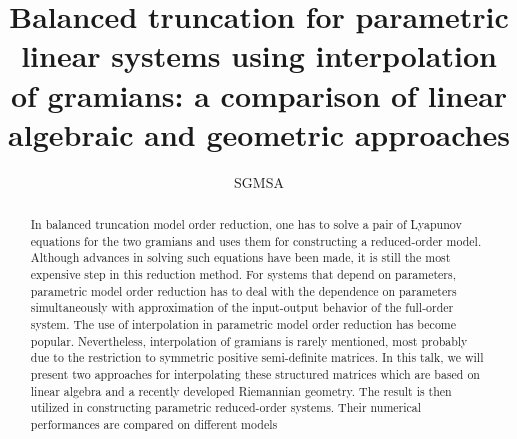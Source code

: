 \title{Balanced truncation for parametric linear systems
	using interpolation of gramians: a comparison of
	linear algebraic and geometric approaches}


\author{SGMSA}  %





\maketitle

\begin{abstract}
In balanced truncation model order reduction, one has to solve a pair of Lyapunov equations for the two gramians and uses them for constructing a reduced-order
model. Although advances in solving such equations have been made, it is still the most
expensive step in this reduction method. For systems that depend on parameters, parametric model order reduction has to deal with the dependence on  parameters simultaneously with approximation of the input-output behavior of the full-order system. The
use of interpolation in parametric model order reduction has become popular. Nevertheless, interpolation of gramians is rarely mentioned, most probably due to the restriction to symmetric
positive semi-definite matrices. In this talk, we will present two approaches for interpolating
these structured matrices which are based on linear algebra and a recently developed Riemannian geometry. The result is then utilized in constructing parametric reduced-order
systems. Their numerical performances are compared on different models
\end{abstract}


